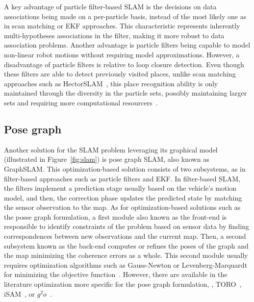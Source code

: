 A key advantage of particle filter-based \gls{SLAM} is the decisions on data associations being made on a per-particle basis, instead of the most likely one as in scan matching or \gls{EKF} approaches. This characteristic represents inherently multi-hypotheses associations in the filter, making it more robust to data association problems.
Another advantage is particle filters being capable to model non-linear robot motions without requiring model approximations.
However, a disadvantage of particle filters is relative to loop closure detection. Even though these filters are able to detect previously visited places, unlike scan matching approaches such as HectorSLAM~\cite{slam:scan-match:hector}, this place recognition ability is only maintained through the diversity in the particle sets, possibly maintaining larger sets and requiring more computational resourcers~\cite{book:probabilistic-robotics}.




\subsection{Pose graph}\label{sec:slam:graph}

Another solution for the \gls{SLAM} problem leveraging its graphical model (illustrated in Figure~\ref{fig:slam}) is pose graph \gls{SLAM}, also known as GraphSLAM. This optimization-based solution consists of two subsystems, as in filter-based approaches such as particle filters and \gls{EKF}.
In filter-based \gls{SLAM}, the filters implement a prediction stage usually based on the vehicle's motion model, and then, the correction phase updates the predicted state by matching the sensor observation to the map.
As for optimization-based solutions such as the posse graph formulation, a first module also known as the front-end is responsible to identify constraints of the problem based on sensor data by finding correspondences between new observations and the current map. Then, a second subsystem known as the back-end computes  or refines the poses of the graph and the map minimizing the coherence errors as a whole. This second module usually requires optimization algorithms such as Gauss-Newton or Levenberg-Marquardt for minimizing the objective function~\cite{review:bresson:2017}. However, there are available in the literature optimization more specific for the pose graph formulation, \eg, \gls{TORO}~\cite{slam:graph:toro}, \gls{iSAM}~\cite{slam:graph:isam,slam:graph:isam2}, or $g^2o$~\cite{slam:graph:g2o}.

